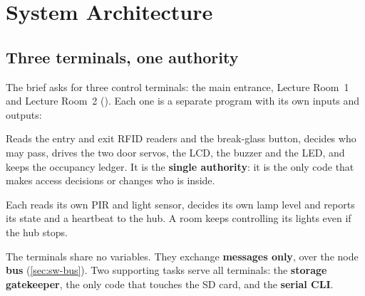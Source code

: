 \section{System Architecture}
\label{sec:arch}

\subsection{Three terminals, one authority}
The brief asks for three control terminals: the main entrance, Lecture Room~1 and Lecture
Room~2 (). Each one is a separate program with its own inputs and outputs:

\begin{description}[leftmargin=1.2em]
  \item[Entrance terminal (the \emph{hub}).] Reads the entry and exit RFID readers and the
        break-glass button, decides who may pass, drives the two door servos, the LCD, the buzzer
        and the LED, and keeps the occupancy ledger. It is the \textbf{single authority}: it is the
        only code that makes access decisions or changes who is inside.
  \item[Room terminals (\emph{room nodes} 1 and 2).] Each reads its own PIR and light sensor,
        decides its own lamp level and reports its state and a heartbeat to the hub. A room keeps
        controlling its lights even if the hub stops.
\end{description}

The terminals share no variables. They exchange \textbf{messages only}, over the node
\textbf{bus} (\cref{sec:sw-bus}). Two supporting tasks serve all terminals: the
\textbf{storage gatekeeper}, the only code that touches the SD card, and the
\textbf{serial CLI}.

